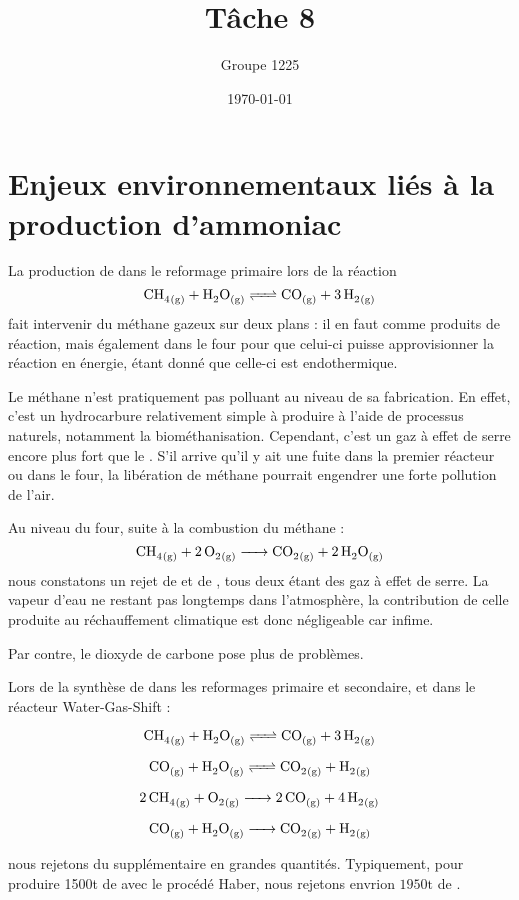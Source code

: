 \documentclass[a4paper, oneside, 12pt]{article}
\title{Tâche 8}
\author{Groupe 1225}
\date{\today}
\begin{document}
\maketitle

\section*{Enjeux environnementaux liés à la production d'ammoniac}

La production de  dans le reformage primaire lors de la réaction
\[ \ce{CH4_{(g)} + H2O_{(g)} <=> CO_{(g)} + 3 \, H2_{(g)}} \]
fait intervenir du méthane gazeux sur deux plans : il en faut comme produits de réaction,
mais également dans le four pour que celui-ci puisse approvisionner la réaction en énergie,
étant donné que celle-ci est endothermique. 

Le méthane n'est pratiquement pas polluant au niveau de sa fabrication. 
En effet, c'est un hydrocarbure relativement simple à produire à l'aide 
de processus naturels, notamment la biométhanisation. 
Cependant, c'est un gaz à effet de serre encore plus fort que le .
S'il arrive qu'il y ait une fuite dans la premier réacteur ou dans le four, 
la libération de méthane pourrait engendrer une forte pollution de l'air.

Au niveau du four, suite à la combustion du méthane : 
\[ \ce{CH4_{(g)} + 2 \, O2_{(g)} -> CO2_{(g)} + 2 \, H2O_{(g)}} \] 
nous constatons un rejet de  et de , 
tous deux étant des gaz à effet de serre. 
La vapeur d'eau ne restant pas longtemps dans l'atmosphère,
la contribution de celle produite au réchauffement climatique est donc négligeable car infime. 
\cite{gaz_effet_de_serre}

Par contre, le dioxyde de carbone pose plus de problèmes. 

Lors de la synthèse de  dans les reformages primaire et secondaire, 
et dans le réacteur Water-Gas-Shift : 

\[ \ce{CH4_{(g)} + H2O_{(g)} <=> CO_{(g)} + 3 \, H2_{(g)}} \]

\[ \ce{CO_{(g)} + H2O_{(g)} <=> CO2_{(g)} + H2_{(g)}} \]

\[ \ce{2 \, CH4_{(g)} + O2_{(g)} -> {2} \, CO_{(g)} + 4 \, H2_{(g)}} \]
	
\[ \ce{CO_{(g)} + H2O_{(g)} -> CO2_{(g)} + H2_{(g)}} \]

nous rejetons du  supplémentaire en grandes quantités. 
Typiquement, pour produire 1500t de  avec le procédé Haber, 
nous rejetons envrion $1950\si{\tonne}$ de .
\end{document}
